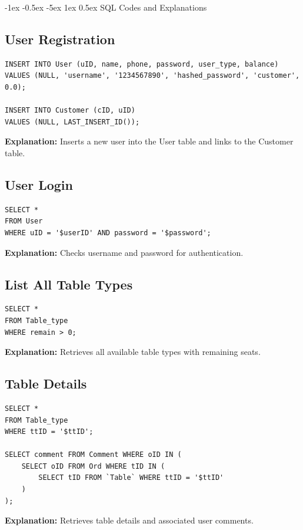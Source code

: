 \documentclass[12pt]{article}
\makeatletter
\renewcommand\section{\@startsection{section}{1}{\z@}%
    {-1ex \@plus -0.5ex \@minus -5ex} %
    {1ex \@plus 0.5ex} %
    {\normalfont\Large\bfseries}} %
\makeatother
\begin{document}
\section{SQL Codes and Explanations}

\subsection{User Registration}
\begin{lstlisting}
INSERT INTO User (uID, name, phone, password, user_type, balance)
VALUES (NULL, 'username', '1234567890', 'hashed_password', 'customer', 0.0);

INSERT INTO Customer (cID, uID)
VALUES (NULL, LAST_INSERT_ID());
\end{lstlisting}
\textbf{Explanation:} Inserts a new user into the User table and links to the Customer table.

\subsection{User Login}
\begin{lstlisting}
SELECT * 
FROM User 
WHERE uID = '$userID' AND password = '$password';
\end{lstlisting}
\textbf{Explanation:} Checks username and password for authentication.

\subsection{List All Table Types}
\begin{lstlisting}
SELECT * 
FROM Table_type 
WHERE remain > 0;
\end{lstlisting}
\textbf{Explanation:} Retrieves all available table types with remaining seats.

\subsection{Table Details}
\begin{lstlisting}
SELECT * 
FROM Table_type 
WHERE ttID = '$ttID';

SELECT comment FROM Comment WHERE oID IN (
    SELECT oID FROM Ord WHERE tID IN (
        SELECT tID FROM `Table` WHERE ttID = '$ttID'
    )
);
\end{lstlisting}
\textbf{Explanation:} Retrieves table details and associated user comments.
\end{document}
